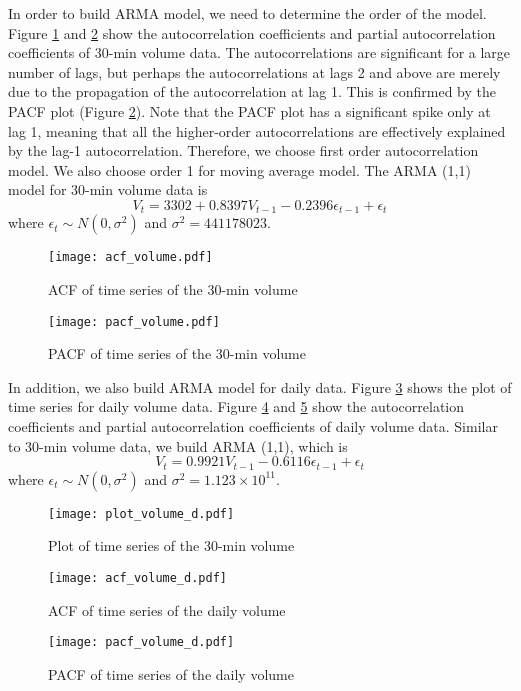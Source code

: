 \documentclass[11pt]{article}
\begin{document}
In order to build ARMA model, we need to determine the order of the model. Figure \ref{acf_volume} and \ref{pacf_volume} show the autocorrelation coefficients and partial autocorrelation coefficients of 30-min volume data. The autocorrelations are significant for a large number of lags, but perhaps the autocorrelations at lags 2 and above are merely due to the propagation of the autocorrelation at lag 1. This is confirmed by the PACF plot (Figure \ref{pacf_volume}). Note that the PACF plot has a significant spike only at lag 1, meaning that all the higher-order autocorrelations are effectively explained by the lag-1 autocorrelation. Therefore, we choose first order autocorrelation model. We also choose order 1 for moving average model. The ARMA (1,1) model for 30-min volume data is
\[
V_t=3302+0.8397V_{t-1}-0.2396\epsilon_{t-1}+\epsilon_t
\]
where $\epsilon_t\sim N(0, \sigma^2)$ and $\sigma^2=441178023$.

\begin{figure}
\texttt{[image: acf\_volume.pdf]}
\caption{ACF of time series of the 30-min volume}\label{acf_volume}
\end{figure}
\begin{figure}
\texttt{[image: pacf\_volume.pdf]}
\caption{PACF of time series of the 30-min volume}\label{pacf_volume}
\end{figure}

In addition, we also build ARMA model for daily data. Figure \ref{plot_volume_d} shows the plot of time series for daily volume data. Figure \ref{acf_volume_d} and \ref{pacf_volume_d} show the autocorrelation coefficients and partial autocorrelation coefficients of daily volume data. Similar to 30-min volume data, we build ARMA (1,1), which is
\[
V_t=0.9921V_{t-1}-0.6116\epsilon_{t-1}+\epsilon_t
\]
where $\epsilon_t\sim N(0, \sigma^2)$ and $\sigma^2=1.123\times 10^{11}$.


\begin{figure}
\texttt{[image: plot\_volume\_d.pdf]}
\caption{Plot of time series of the 30-min volume}\label{plot_volume_d}
\end{figure}

\begin{figure}
\texttt{[image: acf\_volume\_d.pdf]}
\caption{ACF of time series of the daily volume}\label{acf_volume_d}
\end{figure}
\begin{figure}
\texttt{[image: pacf\_volume\_d.pdf]}
\caption{PACF of time series of the daily volume}\label{pacf_volume_d}
\end{figure}

\end{document}
